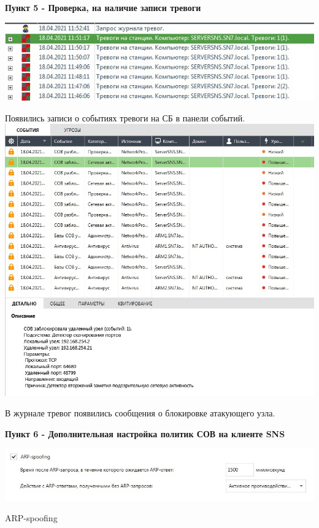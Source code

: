 \documentclass[a4paper,14pt]{extarticle}
\begin{document}
    \textbf{Пункт 5 - Проверка, на наличие записи тревоги}
    \begin{center}
        \includegraphics[scale=0.6]{pics/5_1.jpg}

        Появились записи о событиях тревоги на СБ в панели событий.
        \includegraphics[scale=0.45]{pics/5_2.jpg}

        В журнале тревог появились сообщения о блокировке атакующего узла.

    \end{center}

    \newpage
    \textbf{Пункт 6 - Дополнительная настройка политик СОВ на клиенте SNS}
    \begin{center}
        \includegraphics[scale=0.6]{pics/6.jpg}


        ARP-spoofing
    \end{center}
\end{document}
